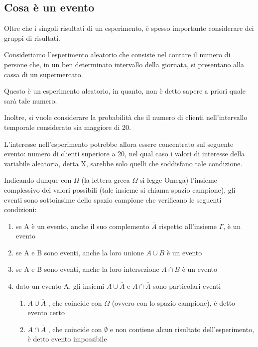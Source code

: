 \subsection{Cosa è un evento} 

Oltre che i singoli risultati di un esperimento, è spesso importante considerare dei gruppi di risultati. \newline 

Consideriamo l'esperimento aleatorio che consiste nel contare il numero di persone che, in un ben determinato intervallo della giornata, si presentano alla cassa di un supermercato. \newline 

Questo è un esperimento aleatorio, in quanto, non è detto sapere a priori quale sarà tale numero. \newline 

Inoltre, si vuole considerare la probabilità che il numero di clienti nell'intervallo temporale considerato sia maggiore di 20. \newline 

L'interesse nell'esperimento potrebbe allora essere concentrato sul seguente evento: numero di clienti superiore a 20, nel qual caso i valori di interesse della variabile aleatoria, detta X, sarebbe solo quelli che soddisfano tale condizione. \newline 

Indicando dunque con $\Omega$ (la lettera greca $\Omega$ si legge Omega) l'insieme complessivo dei valori possibili (tale insieme si chiama spazio campione), 
gli eventi sono sottoinsime dello spazio campione che verificano le seguenti condizioni:

\begin{enumerate}
    \item se A è un evento, anche il suo complemento $\overline{A}$ rispetto all'insieme $\Gamma$, è un evento 
    \item se A e B sono eventi, anche la loro unione $A \cup B$ è un evento 
    \item se A e B sono eventi, anche la loro intersezione $A \cap B$ è un evento 
    \item dato un evento A, gli insiemi $A \cup \overline{A}$ e $A \cap \overline{A}$ sono particolari eventi 
    \begin{enumerate}
        \item $A \cup \overline{A}$ , che coincide con $\Omega$ (ovvero con lo spazio campione), è detto evento certo 
        \item $A \cap \overline{A}$ , che coincide con $\emptyset$ e non contiene alcun risultato dell'esperimento, è detto evento impossibile
    \end{enumerate}
\end{enumerate} 

